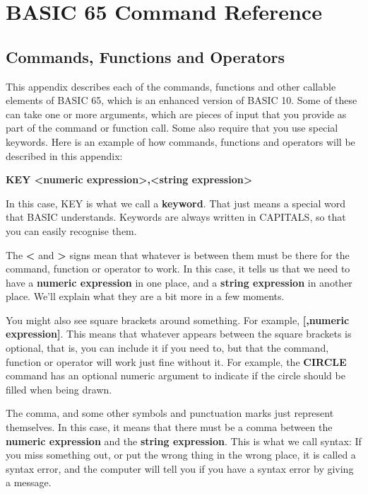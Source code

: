 \hypersetup{bookmarksdepth=2}
\chapter{BASIC 65 Command Reference}

\section{Commands, Functions and Operators}

This appendix describes each of the commands, functions and other
callable elements of BASIC 65, which is an enhanced version of BASIC 10.
Some of these can take one or more arguments, which are pieces of input
that you provide as part of the command or function call.
Some also require that you use special keywords.
Here is an example of how commands, functions and operators will be
described in this appendix:

{\bf KEY <numeric expression>,<string expression> }

In this case, KEY is what we call a \textbf{keyword}. That just means
a special word that BASIC understands.
Keywords are always written in CAPITALS, so that you can easily
recognise them.

The {\bf <} and {\bf >} signs mean that whatever is between them must
be there for the command, function or operator to work.
In this case, it tells us that we need to have a
{\bf numeric expression} in one place, and a {\bf string expression}
in another place.
We'll explain what they are a bit more in a few moments.

You might also see square brackets around something. For example,
{\bf [,numeric expression]}.
This means that whatever appears between the square brackets is
optional, that is, you can include it if you need to, but
that the command, function or operator will work just fine without it.
For example, the {\bf CIRCLE} command has
an optional numeric argument to indicate if the circle should be filled
when being drawn.

The comma, and some other symbols and punctuation marks just represent themselves.
In this case, it means that there must be a comma between the
{\bf numeric expression} and the {\bf string expression}.
This is what we call syntax: If you miss something out, or put the
wrong thing in the wrong place, it is called a
syntax error, and the computer will tell you if you have a syntax error
by giving a  message.

